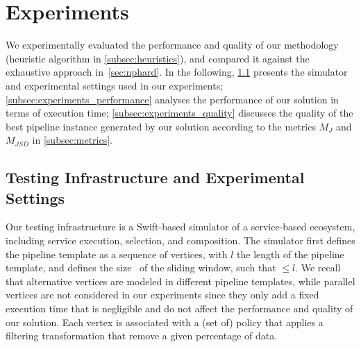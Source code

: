 \section{Experiments}\label{sec:experiment}
We experimentally evaluated the performance and quality of our methodology (heuristic algorithm in \cref{subsec:heuristics}), and compared it against the exhaustive approach in~\cref{sec:nphard}. In the following,
\cref{subsec:experiments_infrastructure} presents the simulator and experimental settings used in our experiments;
\cref{subsec:experiments_performance} analyses the performance of our solution in terms of execution time; \cref{subsec:experiments_quality} discusses the quality of the best pipeline instance generated by our solution according to the metrics $M_J$ and $M_{JSD}$ in \cref{subsec:metrics}.

\subsection{Testing Infrastructure and Experimental Settings}\label{subsec:experiments_infrastructure}
Our testing infrastructure is a Swift-based simulator of a service-based ecosystem, including service execution, selection, and composition. The simulator first defines the pipeline template as a sequence of vertices, with $l$ the length of the pipeline template, and defines the size \windowsize\ of the sliding window, such that \windowsize$\leq$$l$. We recall that alternative vertices are modeled in different pipeline templates, while parallel vertices are not considered in our experiments since they only add a fixed execution time that is negligible and do not affect the performance and quality of our solution. Each vertex is associated with a (set of) policy that applies a filtering transformation that remove a given percentage of data.

